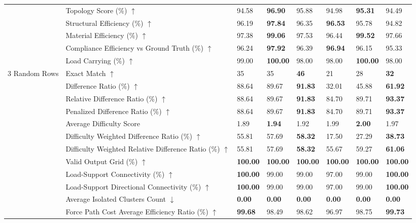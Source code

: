 \begin{table}[!h]
{\begin{tabular}{lllll|lll}
 & Topology Score (\%) $\uparrow$ & 94.58 & \textbf{96.90} & 95.88 & 94.98 & \textbf{95.31} & 94.49 \\
 & Structural Efficiency (\%) $\uparrow$ & 96.19 & \textbf{97.84} & 96.35 & \textbf{96.53} & 95.78 & 94.82 \\
 & Material Efficiency (\%) $\uparrow$ & 97.38 & \textbf{99.06} & 97.53 & 96.44 & \textbf{99.52} & 97.66 \\
 & Compliance Efficiency vs Ground Truth (\%) $\uparrow$ & 96.24 & \textbf{97.92} & 96.39 & \textbf{96.94} & 96.15 & 95.33 \\
 & Load Carrying (\%) $\uparrow$ & 99.00 & \textbf{100.00} & 98.00 & 98.00 & \textbf{100.00} & 98.00 \\
\midrule
3 Random Rows & Exact Match $\uparrow$ & 35 & 35 & \textbf{46} & 21 & 28 & \textbf{32} \\
 & Difference Ratio (\%) $\uparrow$ & 88.64 & 89.67 & \textbf{91.83} & 32.01 & 45.88 & \textbf{61.92} \\
 & Relative Difference Ratio (\%) $\uparrow$ & 88.64 & 89.67 & \textbf{91.83} & 84.70 & 89.71 & \textbf{93.37} \\
 & Penalized Difference Ratio (\%) $\uparrow$ & 88.64 & 89.67 & \textbf{91.83} & 84.70 & 89.71 & \textbf{93.37} \\
 & Average Difficulty Score & 1.89 & \textbf{1.94} & 1.92 & 1.99 & \textbf{2.00} & 1.97 \\
 & Difficulty Weighted Difference Ratio (\%) $\uparrow$ & 55.81 & 57.69 & \textbf{58.32} & 17.50 & 27.29 & \textbf{38.73} \\
 & Difficulty Weighted Relative Difference Ratio (\%) $\uparrow$ & 55.81 & 57.69 & \textbf{58.32} & 55.67 & 59.27 & \textbf{61.06} \\
 & Valid Output Grid (\%) $\uparrow$ & \textbf{100.00} & \textbf{100.00} & \textbf{100.00} & \textbf{100.00} & \textbf{100.00} & \textbf{100.00} \\
 & Load-Support Connectivity (\%) $\uparrow$ & \textbf{100.00} & 99.00 & 99.00 & 97.00 & 99.00 & \textbf{100.00} \\
 & Load-Support Directional Connectivity (\%) $\uparrow$ & \textbf{100.00} & 99.00 & 99.00 & 97.00 & 99.00 & \textbf{100.00} \\
 & Average Isolated Clusters Count $\downarrow$ & \textbf{0.00} & \textbf{0.00} & \textbf{0.00} & \textbf{0.00} & \textbf{0.00} & \textbf{0.00} \\
 & Force Path Cost Average Efficiency Ratio (\%) $\uparrow$ & \textbf{99.68} & 98.49 & 98.62 & 96.97 & 98.75 & \textbf{99.73} \\

\end{tabular}}
\end{table}
